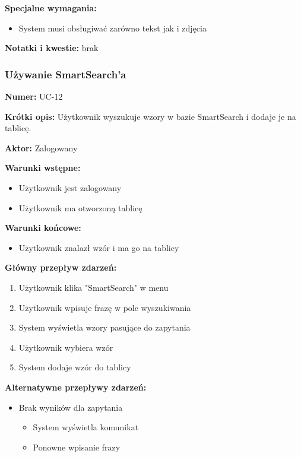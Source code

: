 \documentclass[12pt,a4paper]{article}
\begin{document}
\textbf{Specjalne wymagania:}
\begin{itemize}
    \item System musi obsługiwać zarówno tekst jak i zdjęcia
\end{itemize}

\textbf{Notatki i kwestie:} brak

\subsubsection{Używanie SmartSearch'a}

\textbf{Numer:} UC-12

\textbf{Krótki opis:} Użytkownik wyszukuje wzory w bazie SmartSearch i dodaje je na tablicę.

\textbf{Aktor:} Zalogowany

\textbf{Warunki wstępne:}
\begin{itemize}[leftmargin=*]
    \item Użytkownik jest zalogowany
    \item Użytkownik ma otworzoną tablicę
\end{itemize}

\textbf{Warunki końcowe:}
\begin{itemize}[leftmargin=*]
    \item Użytkownik znalazł wzór i ma go na tablicy
\end{itemize}

\textbf{Główny przepływ zdarzeń:}
\begin{enumerate}[leftmargin=*]
    \item Użytkownik klika "SmartSearch" w menu
    \item Użytkownik wpisuje frazę w pole wyszukiwania
    \item System wyświetla wzory pasujące do zapytania
    \item Użytkownik wybiera wzór
    \item System dodaje wzór do tablicy
\end{enumerate}

\textbf{Alternatywne przepływy zdarzeń:}
\begin{itemize}[leftmargin=*]
    \item[2a] Brak wyników dla zapytania
    \begin{itemize}
    \item System wyświetla komunikat
    \item Ponowne wpisanie frazy
\end{itemize}
\end{itemize}
\end{document}
